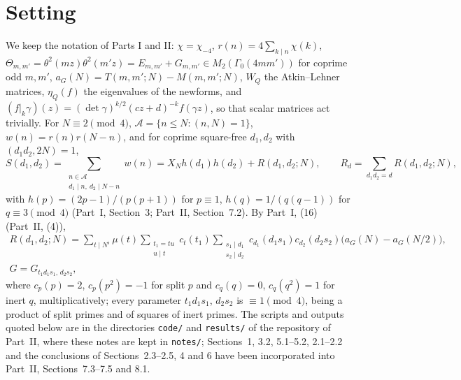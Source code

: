 \documentclass[11pt,a4paper]{article}
\theoremstyle{remark}
\theoremstyle{definition}
\newcommand{\e}{\varepsilon}
\newcommand{\cA}{\mathcal A}
\begin{document}
\begin{abstract}
$\Delta>1/2$, almost all $N$ have the level of distribution $\Delta-\e$ (unconditionally, from the mean-square theorem of Part~II); a mean square of $a_G(n)$ over the interval itself, equivalent to a large-sieve inequality $\lambda_{\max}\ll(1+H/L)/X$ for the Poincar\'e series of the interval, would raise this to $(1+\Delta)/2$ for every $\Delta>0$, and its Kloosterman form is the obstacle of (2) in its symmetric, more favourable shape; numerically it holds for the forms $G_{m,m'}$ with room to spare, down to $H=16$ and without the term $L$.
\end{abstract}

\section*{Setting}
We keep the notation of Parts I and II: $\chi=\chi_{-4}$, $r(n)=4\sum_{k\mid n}\chi(k)$, $\Theta_{m,m'}=\theta^2(mz)\theta^2(m'z)=E_{m,m'}+G_{m,m'}\in M_2(\Gamma_0(4mm'))$ for coprime odd $m,m'$, $a_{G}(N)=T(m,m';N)-M(m,m';N)$, $W_Q$ the Atkin--Lehner matrices, $\eta_Q(f)$ the eigenvalues of the newforms, and $(f|_k\gamma)(z)=(\det\gamma)^{k/2}(cz+d)^{-k}f(\gamma z)$, so that scalar matrices act trivially. For $N\equiv2\pmod4$, $\cA=\{n\le N:(n,N)=1\}$, $w(n)=r(n)r(N-n)$, and for coprime square-free $d_1,d_2$ with $(d_1d_2,2N)=1$,
\[
S(d_1,d_2)=\sum_{\substack{n\in\cA\\ d_1\mid n,\ d_2\mid N-n}}w(n)=X_Nh(d_1)h(d_2)+R(d_1,d_2;N),\qquad R_d=\sum_{d_1d_2=d}R(d_1,d_2;N),
\]
with $h(p)=(2p-1)/(p(p+1))$ for $p\equiv1$, $h(q)=1/(q(q-1))$ for $q\equiv3\pmod4$ (Part~I, Section~3; Part~II, Section~7.2). By Part~I, (16) (Part~II, (4)),
\begin{multline}\label{eq:Rdecomp}
R(d_1,d_2;N)=\sum_{t\mid N^\flat}\mu(t)\sum_{\substack{t_1=tu\\ u\mid t}}c_t(t_1)\sum_{\substack{s_1\mid d_1\\ s_2\mid d_2}}c_{d_1}(d_1s_1)c_{d_2}(d_2s_2)\bigl(a_G(N)-a_G(N/2)\bigr),\\ G=G_{t_1d_1s_1,\,d_2s_2},
\end{multline}
where $c_p(p)=2$, $c_p(p^2)=-1$ for split $p$ and $c_q(q)=0$, $c_q(q^2)=1$ for inert $q$, multiplicatively; every parameter $t_1d_1s_1$, $d_2s_2$ is $\equiv1\pmod4$, being a product of split primes and of squares of inert primes. The scripts and outputs quoted below are in the directories \texttt{code/} and \texttt{results/} of the repository of Part~II, where these notes are kept in \texttt{notes/}; Sections~1, 3.2, 5.1--5.2, 2.1--2.2 and the conclusions of Sections~2.3--2.5, 4 and 6 have been incorporated into Part~II, Sections~7.3--7.5 and 8.1.
\end{document}
